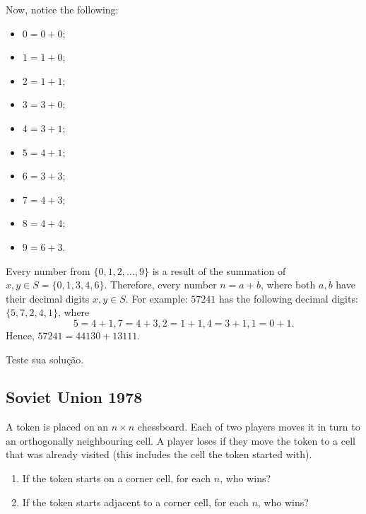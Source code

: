 \documentclass[12pt]{article}
\begin{document}
Now, notice the following:
\begin{itemize}
	\item $0=0+0$;
	\item $1=1+0$;
	\item $2=1+1$;
	\item $3=3+0$;
	\item $4=3+1$;
	\item $5=4+1$;
	\item $6=3+3$;
	\item $7=4+3$;
	\item $8=4+4$;
	\item $9=6+3$.
\end{itemize}
Every number from $\{0,1,2,\dots,9\}$ is a result of the summation of $x,y\in S=\{0,1,3,4,6\}$.
Therefore, every number $n=a+b$, where both $a,b$ have their decimal digits $x,y\in S$.
For example: $57241$ has the following decimal digits: $\{5,7,2,4,1\}$, where
\[
	5=4+1, 7=4+3, 2=1+1, 4=3+1, 1=0+1.
\]
Hence, $57241=44130+13111$.

\begin{insight}
	Teste sua solução.
\end{insight}

\clearpage

\subsection{Soviet Union 1978}

\begin{problem}
A token is placed on an $n\times n$ chessboard.
Each of two players moves it in turn to an orthogonally neighbouring cell.
A player loses if they move the token to a cell that was already visited
(this includes the cell the token started with).
\begin{enumerate}
	\item If the token starts on a corner cell, for each $n$, who wins?
	\item If the token starts adjacent to a corner cell, for each $n$, who wins?
\end{enumerate}
\end{problem}
\end{document}
